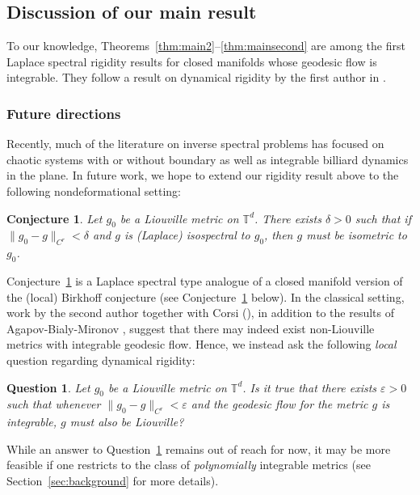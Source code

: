 \documentclass[11pt,letterpaper,oneside]{amsart}
\newcommand{\T}{\mathbb{T}}
\newtheorem{quest}[theo]{Question}
\newtheorem{conj}[theo]{Conjecture}
\theoremstyle{definition}
\theoremstyle{remark}
\newcommand{\eps}{\varepsilon}
\newcommand{\dt}{\delta}
\theoremstyle{definition}
\theoremstyle{remark}
\begin{document}
\subsection{Discussion of our main result} \label{subsec:discuss}
To our knowledge, Theorems~\ref{thm:main2}--\ref{thm:mainsecond} are among the first Laplace spectral rigidity results for closed manifolds whose geodesic flow is integrable. They follow a result on dynamical rigidity by the first author in \cite{henheik2025deformational}. 






\subsubsection{Future directions} 
Recently, much of the literature on inverse spectral problems has focused on chaotic systems with or without boundary as well as integrable billiard dynamics in the plane. In future work, we hope to extend our rigidity result above to the following nondeformational setting:

\begin{conj}\label{conj:localquantum}
    Let $g_0$ be a Liouville metric on $\T^d$. There exists $\dt >0$ such that if $\|g_0 - g\|_{C^r} < \dt$ and $g$ is (Laplace) isospectral to $g_0$, then $g$ must be isometric to $g_0$.
\end{conj}

Conjecture~\ref{conj:localquantum} is a Laplace spectral type analogue of a closed manifold version of the (local) Birkhoff conjecture (see Conjecture~\ref{conj:localclassical} below). In the classical setting, work by the second author together with Corsi (\cite{CorsiKaloshin2018}), in addition to the results of Agapov-Bialy-Mironov \cite{ABM}, suggest that there may indeed exist non-Liouville metrics with integrable geodesic flow. Hence, we instead ask the following \textit{local} question regarding dynamical rigidity:
\begin{quest}\label{conj:localclassical}
    Let $g_0$ be a Liouville metric on $\T^d$. Is it true that there exists $\eps >0$ such that whenever $\|g_0 - g\|_{C^r} < \eps$ and the geodesic flow for the metric $g$ is integrable, $g$ must also be Liouville?
\end{quest}

While an answer to Question~\ref{conj:localclassical} remains out of reach for now, it may be more feasible if one restricts to the class of \textit{polynomially} integrable metrics (see Section~\ref{sec:background} for more details).
\end{document}

